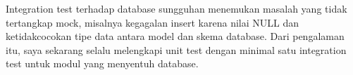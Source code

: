 Integration test terhadap database sungguhan menemukan masalah yang tidak tertangkap mock, misalnya kegagalan insert karena nilai NULL dan ketidakcocokan tipe data antara model dan skema database. Dari pengalaman itu, saya sekarang selalu melengkapi unit test dengan minimal satu integration test untuk modul yang menyentuh database.

\clearpage
